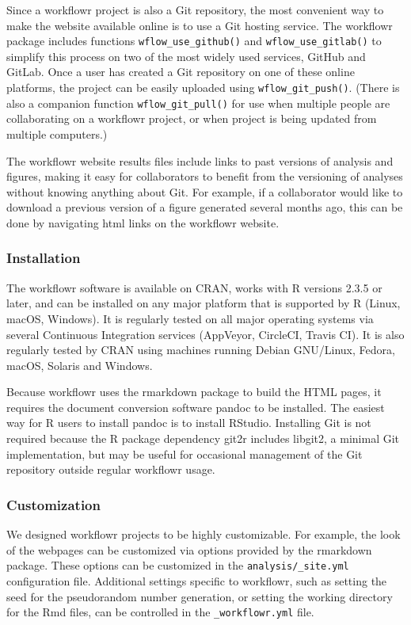 \documentclass[9pt,a4paper]{extarticle}
\begin{document}
Since a workflowr project is also a Git repository, the most convenient
way to make the website available online is to use a Git hosting
service. The workflowr package includes functions \texttt{wflow\_use\_github()} and
\texttt{wflow\_use\_gitlab()} to simplify this process on two of the most widely
used services, GitHub and GitLab. Once a user has created a Git
repository on one of these online platforms, the project can be easily
uploaded using \texttt{wflow\_git\_push()}. (There is also a companion function
\texttt{wflow\_git\_pull()} for use when multiple people are collaborating on a
workflowr project, or when project is being updated from multiple
computers.)

The workflowr website results files include links to past versions of
analysis and figures, making it easy for collaborators to benefit from
the versioning of analyses without knowing anything about Git. For
example, if a collaborator would like to download a previous version of
a figure generated several months ago, this can be done by navigating
html links on the workflowr website.

\subsubsection*{Installation}

The workflowr software is available on CRAN, works with R versions 2.3.5
or later, and can be installed on any major platform that is supported
by R (Linux, macOS, Windows). It is regularly tested on all major
operating systems via several Continuous Integration services (AppVeyor,
CircleCI, Travis CI). It is also regularly tested by CRAN using machines
running Debian GNU/Linux, Fedora, macOS, Solaris and Windows.

Because workflowr uses the rmarkdown package to build the HTML pages, it
requires the document conversion software pandoc to be installed. The
easiest way for R users to install pandoc is to install RStudio.
Installing Git is not required because the R package dependency git2r
includes libgit2, a minimal Git implementation, but may be useful for
occasional management of the Git repository outside regular workflowr
usage.

\subsubsection*{Customization}

We designed workflowr projects to be highly customizable. For example,
the look of the webpages can be customized via options provided by the
rmarkdown package. These options can be customized in the
\verb|analysis/_site.yml| configuration file. Additional settings
specific to workflowr, such as setting the seed for the pseudorandom
number generation, or setting the working directory for the Rmd files,
can be controlled in the \verb|_workflowr.yml| file.
\end{document}
